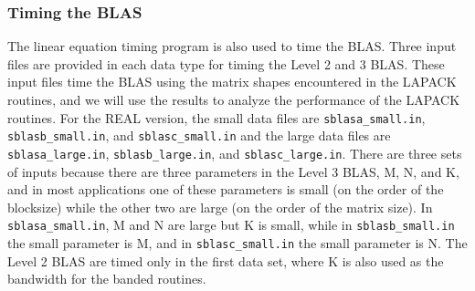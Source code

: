 \documentclass[11pt]{report}
\begin{document}
\subsubsection{Timing the BLAS}\label{timeblas}

The linear equation timing program is also used to time the BLAS.
Three input files are provided in each data type for timing the Level
2 and 3 BLAS. 
These input files time the BLAS using the matrix shapes encountered
in the LAPACK routines, and we will use the results to analyze the
performance of the LAPACK routines. 
For the REAL version, the small data files are
\texttt{sblasa\_small.in}, \texttt{sblasb\_small.in}, and \texttt{sblasc\_small.in}
and the large data files are
\texttt{sblasa\_large.in}, \texttt{sblasb\_large.in}, and \texttt{sblasc\_large.in}.
There are three sets of inputs because there are three
parameters in the Level 3 BLAS, M, N, and K, and
in most applications one of these parameters is small (on the order
of the blocksize) while the other two are large (on the order of the
matrix size).  
In \texttt{sblasa\_small.in}, M and N are large but K is
small, while in \texttt{sblasb\_small.in} the small parameter is M, and
in \texttt{sblasc\_small.in} the small parameter is N.  
The Level 2 BLAS are timed only in the first data set, where K
is also used as the bandwidth for the banded routines.
\end{document}
